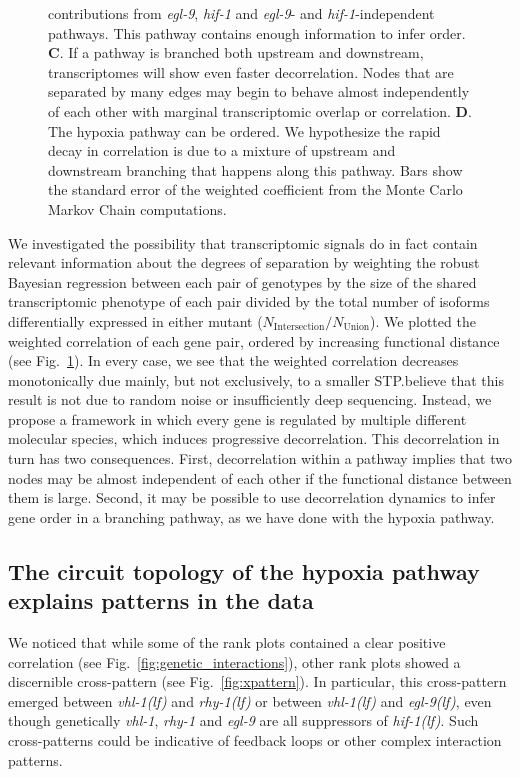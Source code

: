 \documentclass[10pt, onecolumn]{article}
\newcommand{\gene}[1]{\emph{#1}}
\newcommand{\egl}{\emph{\mbox{egl-9}(lf)}}
\newcommand{\rhy}{\emph{\mbox{rhy-1}(lf)}}
\newcommand{\vhl}{\emph{\mbox{vhl-1}(lf)}}
\newcommand{\hif}{\emph{\mbox{hif-1(lf)}}}
\begin{document}
\begin{figure}[tbhp]
{contributions from \gene{egl-9}, \gene{hif-1} and \gene{egl-9}- and
\gene{hif-1}-independent pathways. This pathway contains enough information to
infer order.
\textbf{C}. If a pathway is branched both upstream and downstream,
transcriptomes will show even faster decorrelation. Nodes that are
separated by many edges may begin to behave almost independently of each other
with marginal transcriptomic overlap or correlation.
\textbf{D}. The hypoxia pathway can be ordered.
We hypothesize the rapid decay in correlation is due to a mixture of
upstream and downstream branching that happens along this pathway. Bars show the
standard error of the weighted coefficient from the Monte Carlo Markov Chain
computations.
}
\label{fig:decorrelation}
\end{figure}

We investigated the possibility that transcriptomic signals do in fact contain
relevant information about the degrees of separation by weighting the robust
Bayesian regression between each pair of genotypes by the size of the shared
transcriptomic phenotype of each pair divided by the total number of isoforms
differentially expressed in either mutant
($N_\mathrm{Intersection}/N_{\mathrm{Union}}$). We plotted the weighted
correlation of each gene pair, ordered by increasing functional distance
(see Fig.~\ref{fig:decorrelation}). In every case, we see that the weighted
correlation decreases monotonically due mainly, but not exclusively, to a smaller
STP.\@We believe that this result is not due to random noise or insufficiently
deep sequencing. Instead, we propose a framework in which every gene is regulated
by multiple different molecular species, which induces progressive decorrelation.
This decorrelation in turn has two consequences. First, decorrelation within a
pathway implies that two nodes may be almost independent of each other if the
functional distance between them is large. Second, it may be possible to use
decorrelation dynamics to infer gene order in a branching pathway, as we have
done with the hypoxia pathway.

\subsection*{The circuit topology of the hypoxia pathway explains patterns in
            the data}
\label{sub:topology}
We noticed that while some of the rank plots contained a clear positive correlation
(see Fig.~\ref{fig:genetic_interactions}), other rank plots showed a discernible
cross-pattern (see Fig.~\ref{fig:xpattern}). In particular, this cross-pattern
emerged between \vhl{} and \rhy{} or between \vhl{} and \egl{}, even though
genetically \gene{vhl-1}, \gene{rhy-1} and \gene{egl-9} are all suppressors of
\hif{}. Such cross-patterns could be indicative of feedback loops or other
complex interaction patterns.
\end{document}
